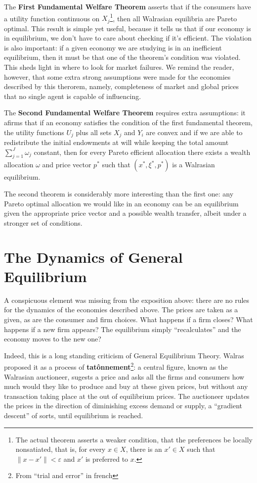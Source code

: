 The \textbf{First Fundamental Welfare Theorem} asserts that if the consumers have
a utility function continuous on $X_j$\footnote{The actual theorem
  asserts a weaker condition, that the preferences be locally
  nonsatiated, that is, for every $x \in X$, there is an $x' \in X$
  such that $\|x - x'\| < \varepsilon$ and $x'$ is preferred to $x$.},
then all Walrasian equilibria are Pareto optimal. This result is
simple yet useful, because it tells us that if our economy is in
equilibrium, we don't have to care about checking if it's
efficient. The violation is also important: if a given economy we are
studying is in an inefficient equilibrium, then it must be that one of
the theorem's condition was violated. This sheds light in where to
look for market failures. We remind the reader, however, that some
extra strong assumptions were made for the economies described by this
therorem, namely, completeness of market and global prices that
no single agent is capable of influencing.

The \textbf{Second Fundamental Welfare Theorem} requires extra
assumptions: it afirms that if an economy satisfies the condition of
the first fundamental theorem, the utility functions $U_j$ plus all
sets $X_j$ and $Y_i$ are convex and if we are able to redistribute the
initial endowments at will while keeping the total amount
$\sum_{j=1}^J \omega_j$ constant, then for every Pareto efficient
allocation there exists a wealth allocation $\omega$ and price vector
$p^\ast$ such that $(x^\ast, \xi^\ast, p^\ast)$ is a Walrasian
equilibrium.

The second theorem is considerably more interesting than the first
one: any Pareto optimal allocation we would like in an economy can be
an equilibrium given the appropriate price vector and a possible
wealth transfer, albeit under a stronger set of conditions.

\section{The Dynamics of General Equilibrium}

A conspicuous element was missing from the exposition above: there are
no rules for the dynamics of the economies described above. The prices
are taken as a given, as are the consumer and firm choices. What
happens if a firm closes? What happens if a new firm appears? The
equilibrium simply ``recalculates'' and the economy moves to the new one?

Indeed, this is a long standing criticism of General Equilibrium
Theory. Walras proposed it as a process of
\textbf{tatônnement}\footnote{From ``trial and error'' in french}: a
central figure, known as the Walrasian auctioneer, sugests a price and
asks all the firms and consumers how much would they like to produce
and buy at these given prices, but without any transaction taking
place at the out of equilibrium prices. The auctioneer updates the
prices in the direction of diminishing excess demand or supply, a
``gradient descent'' of sorts, until equilibrium is reached.

